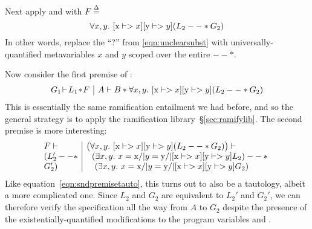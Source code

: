 
Next apply  and  with $F \defeq \null$
\vspace*{-0.75ex}
\[
\forall x, y.~ [\tx{x} |-> x][\tx{y} |-> y](L_2 --* G_2)
\vspace*{-0.75ex}
\]
In other words, replace the ``?'' from \eqref{eqn:unclearsubst} with universally-quantified metavariables $x$ and $y$ scoped over the entire $--*$.

Now consider the first premise of :
\[
\begin{array}{@{}l|l@{}}
G_1 \! |- \! L_1 \! * \! F & A |- B * \forall x, y.~ [\tx{x} |-> x][\tx{y} |-> y](L_2 --* G_2)
\end{array}
\]
This is essentially the same ramification entailment we had before, and so the general strategy is to apply the ramification library~\S\ref{sec:ramifylib}.  The second premise is more interesting:
\[
\begin{array}{@{}l|l@{}}
F |- & \big(\forall x, y.~ [\tx{x} |-> x][\tx{y} |-> y](L_2 --* G_2) \big) |- \null \\
(L_2' --* & ~~ (\exists x,y.~ x = \tx{x} /| y = \tx{y} /| [\tx{x} |-> x][\tx{y} |-> y] L_2) --* \null \\
G_2') & \quad (\exists x,y. ~ x = \tx{x} /| y = \tx{y} /| [\tx{x} |-> x][\tx{y} |-> y] G_2)
\end{array}
\]
Like equation~\eqref{eqn:sndpremisetauto}, this turns out to also be a tautology, albeit a more complicated one.
Since $L_2$ and $G_2$ are equivalent to $L_2'$ and $G_2'$, we can therefore verify the specification all the way from $A$ to $G_2$ despite the presence of the existentially-quantified modifications to the program variables  and .

